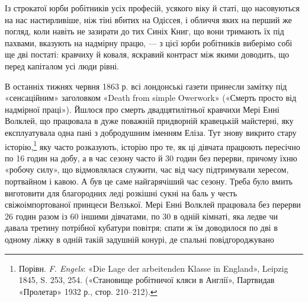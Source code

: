 Із строкатої юрби робітників усіх професій, усякого віку й
статі, що насовуються на нас настирливіше, ніж тіні вбитих на
Одіссея, і обличчя яких на перший же погляд, коли навіть не
зазирати до тих Синіх Книг, що вони тримають їх під пахвами,
вказують на надмірну працю, — з цієї юрби робітників виберімо
собі ще дві постаті: кравчиху й коваля, яскравий контраст між
якими доводить, що перед капіталом усі люди рівні.

В останніх тижнях червня 1863 р. всі лондонські газети принесли
замітку під «сенсаційним» заголовком «Death from simple
Owerwork» («Смерть просто від надмірної праці»). Йшлося про
смерть двадцятилітньої кравчихи Мері Енні Волклей, що працювала
в дуже поважній придворній кравецькій майстерні, яку експлуатувала
одна пані з добродушним іменням Еліза. Тут знову
викрито стару історію,\footnote{
Порівн. \emph{F. Engels}: «Die Lage der arbeitenden Klasse in England»,
Leipzig 1845, S. 253, 254. («Становище робітничої кляси в Англії»,
Партвидав «Пролетар» 1932 р., стор. 210--212).
} яку часто розказують, історію про те,
як ці дівчата працюють пересічно по 16 годин на добу, а в час
сезону часто й 30 годин без перерви, причому їхню «робочу силу»,
що відмовлялася служити, час від часу підтримували хересом,
портвайном і кавою. А був це саме найгарячіший час сезону. Треба
було вмить виготовити для благородних леді розкішні сукні на
баль у честь свіжоімпортованої принцеси Велзької. Мері Енні
Волклей працювала без перерви 26 годин разом із 60 іншими
дівчатами, по 30 в одній кімнаті, яка ледве чи давала третину
потрібної кубатури повітря; спати ж їм доводилося по дві в одному
ліжку в одній такій задушній конурі, де спальні повідгороджувано
